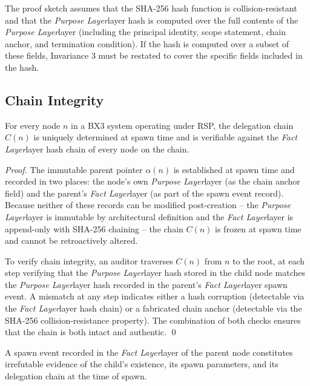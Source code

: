 \documentclass[12pt]{article}
\def\purpose{\textit{Purpose Layer}}
\def\fact{\textit{Fact Layer}}
\begin{document}
\begin{rem}
The proof sketch assumes that the SHA-256 hash function is collision-resistant and that the \purpose layer hash is computed over the full contents of the \purpose layer (including the principal identity, scope statement, chain anchor, and termination condition). If the hash is computed over a subset of these fields, Invariance 3 must be restated to cover the specific fields included in the hash.
\end{rem}

\subsection{Chain Integrity}

\begin{thrm}
\label{thrm:chain-integrity}
For every node $n$ in a BX3 system operating under RSP, the delegation chain $C(n)$ is uniquely determined at spawn time and is verifiable against the \fact layer hash chain of every node on the chain.
\end{thrm}

\begin{proof}
The immutable parent pointer $\alpha(n)$ is established at spawn time and recorded in two places: the node's own \purpose layer (as the chain anchor field) and the parent's \fact layer (as part of the spawn event record). Because neither of these records can be modified post-creation -- the \purpose layer is immutable by architectural definition and the \fact layer is append-only with SHA-256 chaining -- the chain $C(n)$ is frozen at spawn time and cannot be retroactively altered.

To verify chain integrity, an auditor traverses $C(n)$ from $n$ to the root, at each step verifying that the \purpose layer hash stored in the child node matches the \purpose layer hash recorded in the parent's \fact layer spawn event. A mismatch at any step indicates either a hash corruption (detectable via the \fact layer hash chain) or a fabricated chain anchor (detectable via the SHA-256 collision-resistance property). The combination of both checks ensures that the chain is both intact and authentic. \qed
\end{proof}

\begin{prop}
\label{prop:non-repudiation}
A spawn event recorded in the \fact layer of the parent node constitutes irrefutable evidence of the child's existence, its spawn parameters, and its delegation chain at the time of spawn.
\end{prop}
\end{document}
